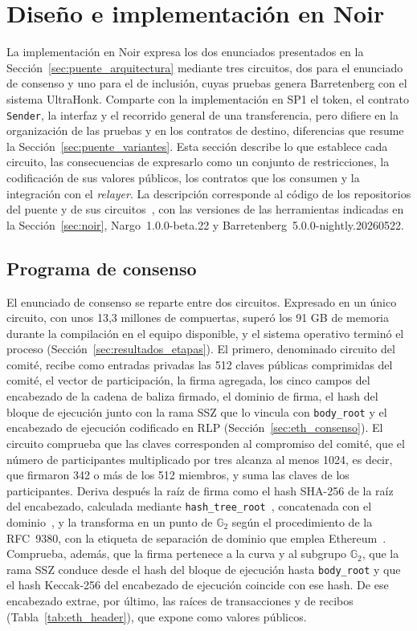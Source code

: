 \section{Diseño e implementación en Noir}
\label{sec:noir_impl}

La implementación en Noir expresa los dos enunciados presentados en la
Sección~\ref{sec:puente_arquitectura} mediante tres circuitos, dos para el enunciado de consenso y
uno para el de inclusión, cuyas pruebas genera Barretenberg con el sistema UltraHonk. Comparte con
la implementación en SP1 el token, el contrato \texttt{Sender}, la interfaz y el recorrido general
de una transferencia, pero difiere en la organización de las pruebas y en los contratos de
destino, diferencias que resume la Sección~\ref{sec:puente_variantes}. Esta sección describe lo
que establece cada circuito, las consecuencias de expresarlo como un conjunto de restricciones,
la codificación de sus valores públicos, los contratos que los consumen y la integración con el
\textit{relayer}. La descripción corresponde al código de los repositorios del puente y de sus
circuitos~\cite{guaranibridgenoir, zkbridgezerorepo, noirmerklerepo}, con las versiones de las
herramientas indicadas en la Sección~\ref{sec:noir}, Nargo~1.0.0-beta.22 y
Barretenberg~5.0.0-nightly.20260522.

\subsection{Programa de consenso}
\label{sec:noir_impl_consenso}

El enunciado de consenso se reparte entre dos circuitos. Expresado en un único circuito, con
unos 13,3 millones de compuertas, superó los 91 GB de memoria durante la compilación en el equipo
disponible, y el sistema operativo terminó el proceso (Sección~\ref{sec:resultados_etapas}). El
primero, denominado circuito del comité, recibe como entradas privadas las 512 claves públicas
comprimidas del comité, el vector de participación, la firma agregada, los cinco campos del
encabezado de la cadena de baliza firmado, el dominio de firma, el hash del bloque de ejecución
junto con la rama SSZ que lo vincula con \texttt{body\_root} y el encabezado de ejecución
codificado en RLP (Sección~\ref{sec:eth_consenso}). El circuito comprueba que las claves
corresponden al compromiso del comité, que el número de participantes multiplicado por tres
alcanza al menos 1024, es decir, que firmaron 342 o más de los 512 miembros, y suma las claves de
los participantes. Deriva después la raíz de firma como el hash SHA-256 de la raíz del encabezado,
calculada mediante \texttt{hash\_tree\_root}~\cite{sszspec}, concatenada con el
dominio~\cite{ethconsensusphase0}, y la transforma en un punto de $\mathbb{G}_2$ según el
procedimiento de la RFC~9380, con la etiqueta de separación de dominio que emplea
Ethereum~\cite{rfc9380}. Comprueba, además, que la firma pertenece a la curva y al subgrupo
$\mathbb{G}_2$, que la rama SSZ conduce desde el hash del bloque de ejecución hasta
\texttt{body\_root} y que el hash Keccak-256 del encabezado de ejecución coincide con ese hash. De
ese encabezado extrae, por último, las raíces de transacciones y de recibos
(Tabla~\ref{tab:eth_header}), que expone como valores públicos.

